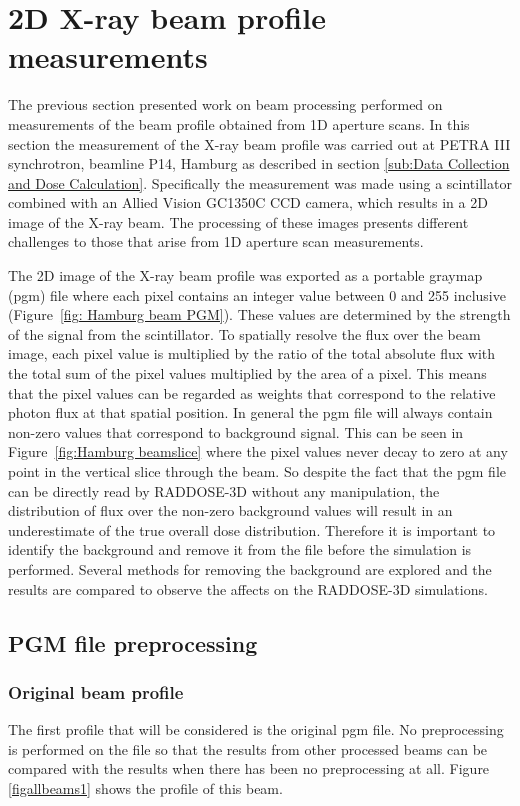 \section{2D X-ray beam profile measurements}
\label{sec:2D X-ray beam profile measurements}
The previous section presented work on beam processing performed on measurements of the beam profile obtained from 1D aperture scans.
In this section the measurement of the X-ray beam profile was carried out at PETRA III synchrotron, beamline P14, Hamburg as described in section \ref{sub:Data Collection and Dose Calculation}.
Specifically the measurement was made using a scintillator combined with an Allied Vision GC1350C CCD camera, which results in a 2D image of the X-ray beam.
The processing of these images presents different challenges to those that arise from 1D aperture scan measurements.

The 2D image of the X-ray beam profile was exported as a portable graymap (pgm) file where each pixel contains an integer value between 0 and 255 inclusive (Figure~\ref{fig: Hamburg beam PGM}).
These values are determined by the strength of the signal from the scintillator.
To spatially resolve the flux over the beam image, each pixel value is multiplied by the ratio of the total absolute flux with the total sum of the pixel values multiplied by the area of a pixel.
This means that the pixel values can be regarded as weights that correspond to the relative photon flux at that spatial position.
In general the pgm file will always contain non-zero values that correspond to background signal.
This can be seen in Figure~\ref{fig:Hamburg beamslice} where the pixel values never decay to zero at any point in the vertical slice through the beam.
So despite the fact that the pgm file can be directly read by RADDOSE-3D without any manipulation, the distribution of flux over the non-zero background values will result in an underestimate of the true overall dose distribution.
Therefore it is important to identify the background and remove it from the file before the simulation is performed.
Several methods for removing the background are explored and the results are compared to observe the affects on the RADDOSE-3D simulations.

\subsection{PGM file preprocessing}
\label{sub:PGM file preprocessing}

\subsubsection{Original beam profile}
\label{subs:Original beam profile}
The first profile that will be considered is the original pgm file. No preprocessing is performed on the file so that the results from other processed beams can be compared with the results when there has been no preprocessing at all. Figure \ref{figallbeams1} shows the profile of this beam.

